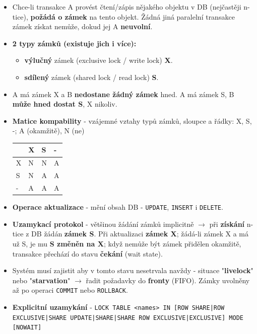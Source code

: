 \begin{itemize}
\item Chce-li transakce A provést čtení/zápis nějakého objektu v DB (nejčastěji n-tice), \textbf{požádá o zámek} na tento objekt. Žádná jiná paralelní transakce zámek získat nemůže, dokud jej A \textbf{neuvolní}.
\item \textbf{2 typy zámků (existuje jich i více):} 
\begin{itemize}
\item \textbf{výlučný} zámek (exclusive lock / write lock) \textbf{X}.
\item \textbf{sdílený} zámek (shared lock / read lock) \textbf{S}.
\end{itemize}
\item A má zámek X a B \textbf{nedostane žádný zámek} hned. A má zámek S, B \textbf{může hned dostat S}, X nikoliv.
\item \textbf{Matice kompability} - vzájemné vztahy typů zámků, sloupce a řádky: X, S, -; A (okamžitě), N (ne)
\begin{table}[H]
	\centering
	\begin{tabular}{|l|l|l|l|}
		\hline
		& X & S & - \\ \hline
		X & N & N & A \\ \hline
		S & N & A & A \\ \hline
		- & A & A & A \\ \hline
	\end{tabular}
\end{table}
\item \textbf{Operace aktualizace} - mění obsah DB - \texttt{UPDATE}, \texttt{INSERT} i \texttt{DELETE}.
\item \textbf{Uzamykací protokol} - většinou žádání zámků implicitně $\rightarrow$ při \textbf{získání} n-tice z DB žádán \textbf{zámek S}. Při aktualizaci \textbf{zámek X}; žádá-li zámek X a má už S, je mu \textbf{S změněn na X}; když nemůže být zámek přidělen okamžitě, transakce přechází do stavu \textbf{čekání} (wait state).
\item Systém musí zajistit aby v tomto stavu nesetrvala navždy - situace "\textbf{livelock}" nebo "\textbf{starvation}" $\rightarrow$ řadit požadavky do \textbf{fronty} (FIFO). Zámky uvolněny až po operaci \texttt{COMMIT} nebo \texttt{ROLLBACK}.
\item \textbf{Explicitní uzamykání} - \texttt{LOCK TABLE <names> IN [ROW SHARE|ROW EXCLUSIVE|SHARE UPDATE|SHARE|SHARE ROW EXCLUSIVE|EXCLUSIVE] MODE [NOWAIT]}
\end{itemize}

